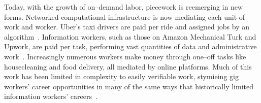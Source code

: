 \documentclass{article}
\newcommand{\topic}[1]{{\color{Blue}#1}}
\begin{document}
\topic{Today, with the growth of on--demand labor, piecework is reemerging in new forms.}
Networked computational infrastructure is now mediating each unit of work and worker.
Uber's taxi drivers are paid per ride and assigned jobs by an algorithm~\cite{uberAlgorithm,hall2015analysis}.
Information workers, such as those on Amazon Mechanical Turk and Upwork, are paid per task,
performing vast quantities of data and administrative work~\cite{martin2014being}.
Increasingly numerous workers make money through one--off tasks like housecleaning and food delivery, all mediated by online platforms.
Much of this work has been limited in complexity to easily verifiable work, stymieing gig workers' career opportunities
in many of the same ways that historically limited information workers' careers~\cite{grier2013computers}.

\begin{comment}
Current legal and policy frameworks classify these workers as independent contractors, precluding them from accessing employee benefits and job security associated with employment.
Complicating matters, today's workers often despise unfair employers but prize the flexibility and autonomy afforded by their platforms~\cite{martin2014being}.
Many view themselves as masters of their own fate, free to enter and leave the workforce at will and without repercussion.
Despite this, they still seek collective representation, as Uber drivers have done repeatedly to combat falling rates.
\end{comment}


\begin{comment}
\topic{How do workers react to, and create collective counterbalances to, the digital piecework economy?}
On the one hand, studies of online communities predict that workers online will face greater challenges, because
trust is more difficult to build in digitally mediated environments~\cite{successfulOnlineCommunities,kollock2005managing,cook2005cooperation}.
Without factory floors, water coolers, and shared neighborhoods~\cite{waterCooler},
how do workers coordinate and build solidarity?
On the other hand,
online forums may make it easier for workers to share information and strategies,
and successful collaborative efforts such as Wikipedia suggest that the online environment may support forms of cooperation that could not have succeeded as readily offline.
\end{comment}
\end{document}
